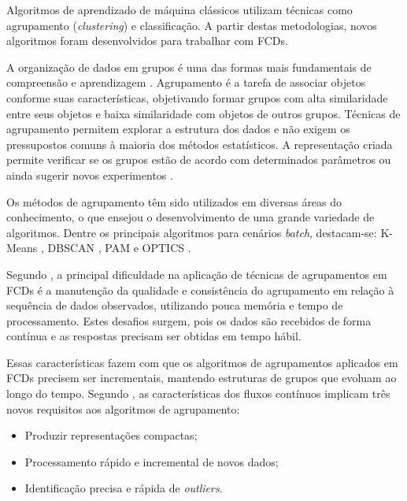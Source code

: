 \documentclass[qual, classic, a4paper]{ufbathesis}
\begin{document}
Algoritmos de aprendizado de máquina clássicos utilizam técnicas como agrupamento (\textit{clustering}) e classificação.
A partir destas metodologias, novos algoritmos foram desenvolvidos para trabalhar com FCDs.

A organização de dados em grupos é uma das formas mais fundamentais de compreensão e aprendizagem \cite{Jain:1988:ACD:46712}.
Agrupamento é a tarefa de associar objetos conforme suas características, objetivando formar grupos com alta similaridade entre seus objetos e baixa similaridade com objetos de outros grupos.
Técnicas de agrupamento permitem explorar a estrutura dos dados e não exigem os pressupostos comuns à maioria dos métodos estatísticos.
A representação criada permite verificar se os grupos estão de acordo com determinados parâmetros ou ainda sugerir novos experimentos \cite{Jain:1988:ACD:46712}.

Os métodos de agrupamento têm sido utilizados em diversas áreas do conhecimento, o que ensejou o desenvolvimento de uma grande variedade de algoritmos.
Dentre os principais algoritmos para cenários \textit{batch}, destacam-se:
K-Means \cite{Lloyd:2006:LSQ:2263356.2269955},
DBSCAN \cite{Ester:1996:DAD:3001460.3001507},
PAM \cite{kaufman:clustering1990} e 
OPTICS \cite{Ankerst:1999:OOP:304181.304187}.

Segundo \cite{Gama:2010:KDD:1855075}, a principal dificuldade na aplicação de técnicas de agrupamentos em FCDs é 
a manutenção da qualidade e consistência do agrupamento em relação à sequência de dados observados, utilizando pouca memória e tempo de processamento. 
Estes desafios surgem, pois os dados são recebidos de forma contínua e as respostas precisam ser obtidas em tempo hábil.

Essas características fazem com que os algoritmos de agrupamentos aplicados em FCDs precisem ser incrementais, mantendo estruturas de grupos que evoluam ao longo do tempo.
Segundo \cite{Barbara:2002:RCD:507515.507519}, as características dos fluxos contínuos implicam três novos requisitos aos algoritmos de agrupamento:

\begin{itemize}
    \item Produzir representações compactas;
    \item Processamento rápido e incremental de novos dados;
    \item Identificação precisa e rápida de \textit{outliers}.
\end{itemize}
\end{document}
